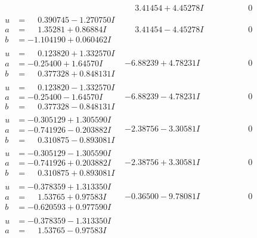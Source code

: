 \documentclass[1p]{elsarticle_modified}
\theoremstyle{definition}
\begin{document}
$$\begin{array}{c|c|c}
 & \phantom{-}3.41454 + 4.45278 I & \phantom{-0.000000 } 0 \\ \hline\begin{aligned}
u &= \phantom{-}0.390745 - 1.270750 I \\
a &= \phantom{-}1.35281 + 0.86884 I \\
b &= -1.104190 + 0.060462 I\end{aligned}
 & \phantom{-}3.41454 - 4.45278 I & \phantom{-0.000000 } 0 \\ \hline\begin{aligned}
u &= \phantom{-}0.123820 + 1.332570 I \\
a &= -0.25400 + 1.64570 I \\
b &= \phantom{-}0.377328 + 0.848131 I\end{aligned}
 & -6.88239 + 4.78231 I & \phantom{-0.000000 } 0 \\ \hline\begin{aligned}
u &= \phantom{-}0.123820 - 1.332570 I \\
a &= -0.25400 - 1.64570 I \\
b &= \phantom{-}0.377328 - 0.848131 I\end{aligned}
 & -6.88239 - 4.78231 I & \phantom{-0.000000 } 0 \\ \hline\begin{aligned}
u &= -0.305129 + 1.305590 I \\
a &= -0.741926 - 0.203882 I \\
b &= \phantom{-}0.310875 - 0.893081 I\end{aligned}
 & -2.38756 - 3.30581 I & \phantom{-0.000000 } 0 \\ \hline\begin{aligned}
u &= -0.305129 - 1.305590 I \\
a &= -0.741926 + 0.203882 I \\
b &= \phantom{-}0.310875 + 0.893081 I\end{aligned}
 & -2.38756 + 3.30581 I & \phantom{-0.000000 } 0 \\ \hline\begin{aligned}
u &= -0.378359 + 1.313350 I \\
a &= \phantom{-}1.53765 + 0.97583 I \\
b &= -0.620593 + 0.977590 I\end{aligned}
 & -0.36500 - 9.78081 I & \phantom{-0.000000 } 0 \\ \hline\begin{aligned}
u &= -0.378359 - 1.313350 I \\
a &= \phantom{-}1.53765 - 0.97583 I \\

\end{aligned}
\end{array}$$
\end{document}

